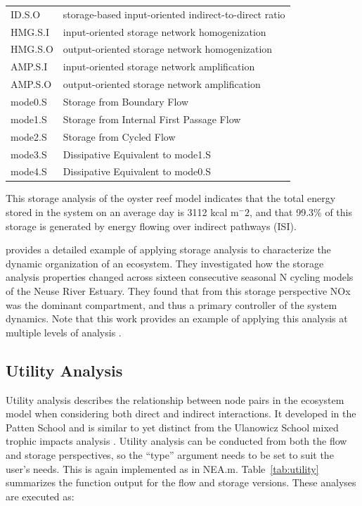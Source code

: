 \documentclass[article]{jss}
\begin{document}
\begin{table}[]
\begin{small}
\begin{tabularx}{\textwidth}{l l}
      ID.S.O & storage-based input-oriented indirect-to-direct ratio \citep[as in][]{fath06}\\
      HMG.S.I & input-oriented storage network homogenization \\
      HMG.S.O & output-oriented storage network homogenization\\
      AMP.S.I &  input-oriented storage network amplification \\
      AMP.S.O & output-oriented storage network amplification \\
      mode0.S & Storage from Boundary Flow \\
      mode1.S & Storage from Internal First Passage Flow \\
      mode2.S & Storage from Cycled Flow \\
      mode3.S & Dissipative Equivalent to mode1.S \\
      mode4.S & Dissipative Equivalent to mode0.S \\ \hline
    \end{tabularx}
\end{small}
\end{table}


This storage analysis of the oyster reef model indicates that the
total energy stored in the system on an average day is 3112 kcal
m$^-2$, and that 99.3\% of this storage is generated by energy flowing
over indirect pathways (ISI).

\citet{whipple2014} provides a detailed example of applying storage
analysis to characterize the dynamic organization of an ecosystem.
They investigated how the storage analysis properties
changed across sixteen consecutive seasonal N cycling models of the
Neuse River Estuary.  They found that from this storage perspective
NOx was the dominant compartment, and thus a primary controller of the
system dynamics.  Note that this work provides an example of applying
this analysis at multiple levels of analysis \citep[e.g.,][]{hines2014}.

\subsection{Utility Analysis}
Utility analysis describes the relationship between node pairs in the
ecosystem model when considering both direct and indirect
interactions.  It developed in the Patten School \citep{patten91,
  fath99_review} and is similar to yet distinct from the Ulanowicz
School mixed trophic impacts analysis \citep{ulanowicz90}.  Utility
analysis can be conducted from both the flow and storage perspectives,
so the ``type'' argument needs to be set to suit the user's needs.
This is again implemented as in NEA.m.  Table~\ref{tab:utility}
summarizes the function output for the flow and storage
versions. These analyses are executed as:
\end{document}
